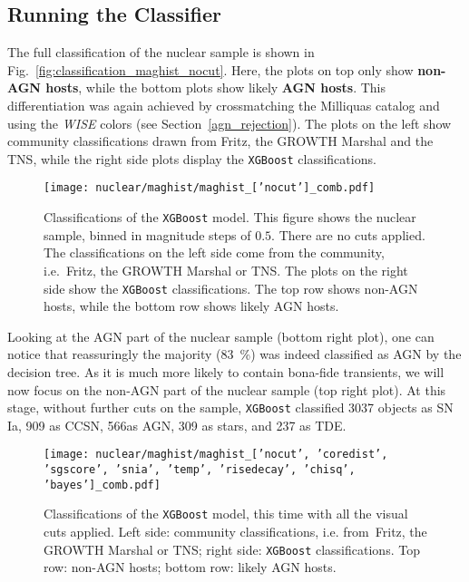 \subsection{Running the Classifier}\label{classifier_res}
The full classification of the nuclear sample is shown in Fig.~\ref{fig:classification_maghist_nocut}. Here, the plots on top only show \textbf{non-AGN hosts}, while the bottom plots show likely \textbf{AGN hosts}. This differentiation was again achieved by crossmatching the Milliquas catalog and using the \textit{WISE} colors (see Section~\ref{agn_rejection}). The plots on the left show community classifications drawn from Fritz, the GROWTH Marshal and the TNS, while the right side plots display the \texttt{XGBoost} classifications.

\begin{figure}[H]
  \texttt{[image: nuclear/maghist/maghist\_['nocut']\_comb.pdf]}
  \caption[Classification without cuts]{Classifications of the \texttt{XGBoost} model. This figure shows the nuclear sample, binned in magnitude steps of $0.5$. There are no cuts applied. The classifications on the left side come from the community, i.e.~Fritz, the GROWTH Marshal or TNS. The plots on the right side show the \texttt{XGBoost} classifications. The top row shows non-AGN hosts, while the bottom row shows likely AGN hosts.}
\end{figure}

Looking at the AGN part of the nuclear sample (bottom right plot), one can notice that reassuringly the majority (\SI{83}{\percent}) was indeed classified as AGN by the decision tree. As it is much more likely to contain bona-fide transients, we will now focus on the non-AGN part of the nuclear sample (top right plot). At this stage, without further cuts on the sample, \texttt{XGBoost} classified 3037 objects as SN Ia, 909 as CCSN, 566as AGN, 309 as stars, and 237 as TDE.

\begin{figure}[htpb]
  \texttt{[image: nuclear/maghist/maghist\_['nocut', 'coredist', 'sgscore', 'snia', 'temp', 'risedecay', 'chisq', 'bayes']\_comb.pdf]}
  \caption[Classification with all visual cuts]{Classifications of the \texttt{XGBoost} model, this time with all the visual cuts applied. Left side: community classifications, i.e. from~Fritz, the GROWTH Marshal or TNS; right side: \texttt{XGBoost} classifications. Top row: non-AGN hosts; bottom row: likely AGN hosts.}
\end{figure}

